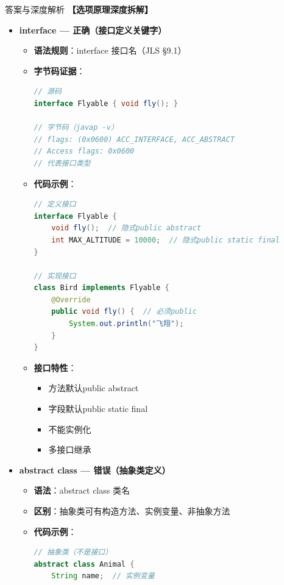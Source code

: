 \documentclass[12pt, a4paper]{ctexart}
\begin{document}
\begin{enumerate}[label=\textbf{\arabic*.}]
\begin{bluebox}{答案与深度解析}
		      \textbf{【选项原理深度拆解】}

		      \begin{itemize}[leftmargin=*, nosep, label={}]
			      \item[A] \textbf{interface — 正确（接口定义关键字）}
			            \begin{itemize}[label={}, leftmargin=*, nosep]
				            \item \textbf{语法规则}：interface 接口名（JLS §9.1）
				            \item \textbf{字节码证据}：
				                  \begin{lstlisting}[language=Java]
// 源码
interface Flyable { void fly(); }

// 字节码（javap -v）
// flags: (0x0600) ACC_INTERFACE, ACC_ABSTRACT
// Access flags: 0x0600
// 代表接口类型
				            \end{lstlisting}
				            \item \textbf{代码示例}：
				                  \begin{lstlisting}[language=Java]
// 定义接口
interface Flyable {
    void fly();  // 隐式public abstract
    int MAX_ALTITUDE = 10000;  // 隐式public static final
}

// 实现接口
class Bird implements Flyable {
    @Override
    public void fly() {  // 必须public
        System.out.println("飞翔");
    }
}
				      \end{lstlisting}
				            \item \textbf{接口特性}：
				                  \begin{itemize}[label={}, nosep]
					                  \item 方法默认public abstract
					                  \item 字段默认public static final
					                  \item 不能实例化
					                  \item 多接口继承
				                  \end{itemize}
			            \end{itemize}

			      \item[B] \textbf{abstract class — 错误（抽象类定义）}
			            \begin{itemize}[label={}, leftmargin=*, nosep]
				            \item \textbf{语法}：abstract class 类名
				            \item \textbf{区别}：抽象类可有构造方法、实例变量、非抽象方法
				            \item \textbf{代码示例}：
				                  \begin{lstlisting}[language=Java]
// 抽象类（不是接口）
abstract class Animal {
    String name;  // 实例变量


\end{lstlisting}
\end{itemize}
\end{itemize}
\end{bluebox}
\end{enumerate}
\end{document}
